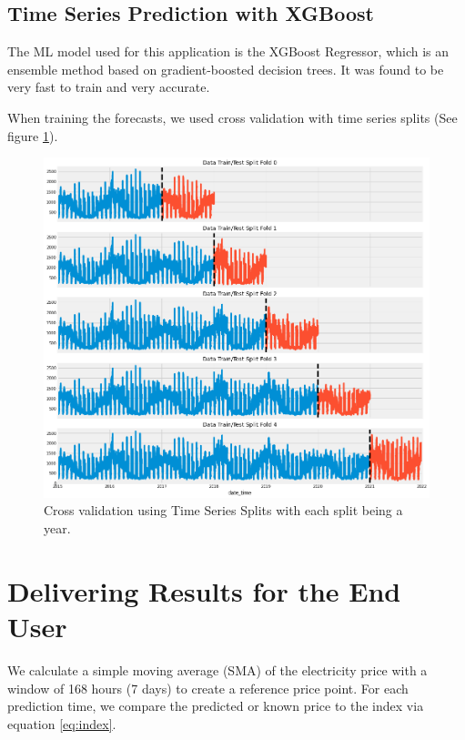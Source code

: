 \documentclass{article}
\begin{document}
\subsection{Time Series Prediction with XGBoost}
\label{subsection:xgboost}

The ML model used for this application is the XGBoost Regressor, which is an ensemble method based on gradient-boosted decision trees. It was found to be very fast to train and very accurate.

When training the forecasts, we used cross validation with time series splits (See figure \ref{fig:ts-cross-validation}).

\begin{figure}
    \centering
    \includegraphics[width=15cm]{report/images/ts-cross-validation.png}
    \caption{Cross validation using Time Series Splits with each split being a year.}
    \label{fig:ts-cross-validation}
\end{figure}



\section{Delivering Results for the End User}
\label{section:delivery}

We calculate a simple moving average (SMA) of the electricity price with a window of 168 hours (7 days) to create a reference price point. For each prediction time, we compare the predicted or known price to the index via equation \ref{eq:index}.
\end{document}
